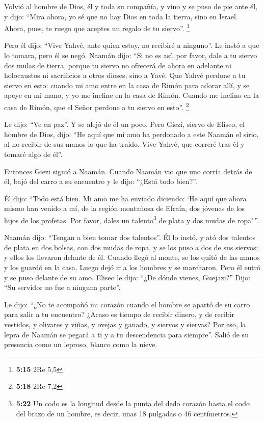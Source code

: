  Volvió al hombre de Dios, él y toda su compañía, y vino
y se puso de pie ante él, y dijo: ``Mira ahora, yo sé que no hay Dios en
toda la tierra, sino en Israel. Ahora, pues, te ruego que aceptes un
regalo de tu siervo''. \footnote{\textbf{5:15} 2Re 5,5}

 Pero él dijo: ``Vive Yahvé, ante quien estoy, no
recibiré a ninguno''. Le instó a que lo tomara, pero él se negó.
 Naamán dijo: ``Si no es así, por favor, dale a tu siervo
dos mulas de tierra, porque tu siervo no ofrecerá de ahora en adelante
ni holocaustos ni sacrificios a otros dioses, sino a Yavé.
 Que Yahvé perdone a tu siervo en esto: cuando mi amo
entre en la casa de Rimón para adorar allí, y se apoye en mi mano, y yo
me incline en la casa de Rimón. Cuando me inclino en la casa de Rimón,
que el Señor perdone a tu siervo en esto''. \footnote{\textbf{5:18} 2Re
  7,2}

 Le dijo: ``Ve en paz''. Y se alejó de él un poco.
 Pero Giezi, siervo de Eliseo, el hombre de Dios, dijo:
``He aquí que mi amo ha perdonado a este Naamán el sirio, al no recibir
de sus manos lo que ha traído. Vive Yahvé, que correré tras él y tomaré
algo de él''.

 Entonces Giezi siguió a Naamán. Cuando Naamán vio que
uno corría detrás de él, bajó del carro a su encuentro y le dijo:
``¿Está todo bien?''.

 Él dijo: ``Todo está bien. Mi amo me ha enviado
diciendo: `He aquí que ahora mismo han venido a mí, de la región
montañosa de Efraín, dos jóvenes de los hijos de los profetas. Por
favor, dales un talento\footnote{\textbf{5:22} Un codo es la longitud
  desde la punta del dedo corazón hasta el codo del brazo de un hombre,
  es decir, unas 18 pulgadas o 46 centímetros.} de plata y dos mudas de
ropa'\,''.

 Naamán dijo: ``Tengan a bien tomar dos talentos''. Él lo
instó, y ató dos talentos de plata en dos bolsas, con dos mudas de ropa,
y se los puso a dos de sus siervos; y ellos los llevaron delante de él.
 Cuando llegó al monte, se los quitó de las manos y los
guardó en la casa. Luego dejó ir a los hombres y se marcharon.
 Pero él entró y se puso delante de su amo. Eliseo le
dijo: ``¿De dónde vienes, Guejazi?'' Dijo: ``Su servidor no fue a
ninguna parte''.

 Le dijo: ``¿No te acompañó mi corazón cuando el hombre
se apartó de su carro para salir a tu encuentro? ¿Acaso es tiempo de
recibir dinero, y de recibir vestidos, y olivares y viñas, y ovejas y
ganado, y siervos y siervas?  Por eso, la lepra de Naamán
se pegará a ti y a tu descendencia para siempre''. Salió de su presencia
como un leproso, blanco como la nieve.

